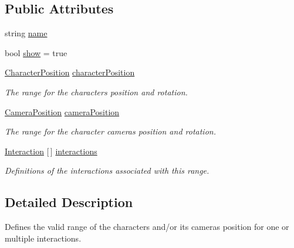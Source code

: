 \subsection*{Public Attributes}
\begin{DoxyCompactItemize}
\item 
string \mbox{\hyperlink{class_root_motion_1_1_final_i_k_1_1_interaction_trigger_1_1_range_ab06390fdfcdbe007312d2b3932283b1f}{name}}
\item 
bool \mbox{\hyperlink{class_root_motion_1_1_final_i_k_1_1_interaction_trigger_1_1_range_a8e3b184785af6b622f9fa5a72cd52a40}{show}} = true
\item 
\mbox{\hyperlink{class_root_motion_1_1_final_i_k_1_1_interaction_trigger_1_1_character_position}{Character\+Position}} \mbox{\hyperlink{class_root_motion_1_1_final_i_k_1_1_interaction_trigger_1_1_range_a548d39631f38ca8575cb5be537cf14cf}{character\+Position}}
\begin{DoxyCompactList}\small\item\em The range for the character\textquotesingle{}s position and rotation. \end{DoxyCompactList}\item 
\mbox{\hyperlink{class_root_motion_1_1_final_i_k_1_1_interaction_trigger_1_1_camera_position}{Camera\+Position}} \mbox{\hyperlink{class_root_motion_1_1_final_i_k_1_1_interaction_trigger_1_1_range_a066e0371f8e9828509c19fa13400c5d9}{camera\+Position}}
\begin{DoxyCompactList}\small\item\em The range for the character camera\textquotesingle{}s position and rotation. \end{DoxyCompactList}\item 
\mbox{\hyperlink{class_root_motion_1_1_final_i_k_1_1_interaction_trigger_1_1_range_1_1_interaction}{Interaction}} \mbox{[}$\,$\mbox{]} \mbox{\hyperlink{class_root_motion_1_1_final_i_k_1_1_interaction_trigger_1_1_range_a4513c0be3525252543c46f043e6f9dd3}{interactions}}
\begin{DoxyCompactList}\small\item\em Definitions of the interactions associated with this range. \end{DoxyCompactList}\end{DoxyCompactItemize}


\subsection{Detailed Description}
Defines the valid range of the character\textquotesingle{}s and/or it\textquotesingle{}s camera\textquotesingle{}s position for one or multiple interactions. 



